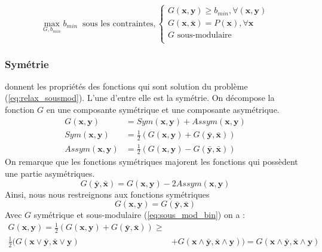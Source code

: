 \documentclass[../main/These_Mathias_Paget.tex]{subfiles}
\begin{document}
	\begin{equation}
		\max_{G,b_{min}}{b_{min}} \; \; \text{sous les contraintes}, \left\{
		\begin{aligned}
			G(\boldsymbol{x},\boldsymbol{y})  \geq b_{min}, \forall (\boldsymbol{x},\boldsymbol{y}) \\
			G(\boldsymbol{x},\bar{\boldsymbol{x}}) =P(\boldsymbol{x}), \forall \boldsymbol{x} \\
			G \text{ sous-modulaire} \\
		\end{aligned}
		\right.
		\label{eq:relax_sousmod}
	\end{equation}	
	
	\subsubsection{Symétrie}
\cite{Kahl12DAM} donnent les propriétés des fonctions qui sont solution du problème (\ref{eq:relax_sousmod}). L'une d'entre elle est la symétrie. On décompose la fonction $G$ en une composante symétrique et une composante asymétrique. 
		\begin{equation}
		\begin{aligned}
		G(\boldsymbol{x},\boldsymbol{y}) &= Sym(\boldsymbol{x},\boldsymbol{y}) + Assym(\boldsymbol{x},\boldsymbol{y}) \\
		Sym(\boldsymbol{x},\boldsymbol{y}) &= \frac{1}{2}(G(\boldsymbol{x},\boldsymbol{y}) + G(\boldsymbol{\bar{y}},\boldsymbol{\bar{x}})) \\
		Assym(\boldsymbol{x},\boldsymbol{y}) &= \frac{1}{2}(G(\boldsymbol{x},\boldsymbol{y}) - G(\boldsymbol{\bar{y}},\boldsymbol{\bar{x}}))		
		\end{aligned}
	\end{equation}
On remarque que les fonctions symétriques majorent les fonctions qui possèdent une partie asymétriques.
	\begin{equation}
		G(\boldsymbol{\bar{y}},\boldsymbol{\bar{x}}) = G(\boldsymbol{x},\boldsymbol{y}) - 2Assym(\boldsymbol{x},\boldsymbol{y})
	\end{equation}	
Ainsi, nous nous restreignons aux fonctions symétriques
	\begin{equation}
		G(\boldsymbol{x},\boldsymbol{y}) = G(\boldsymbol{\bar{y}},\boldsymbol{\bar{x}})
	\end{equation}
	Avec $G$ symétrique et sous-modulaire (\ref{eq:sous_mod_bin}) on a :
	\begin{equation}
	\begin{aligned}
	G(\boldsymbol{x},\boldsymbol{y}) = \frac{1}{2}( G(\boldsymbol{x},\boldsymbol{y}) + G(\boldsymbol{\bar{y}},\boldsymbol{\bar{x}}) ) \geq  & \\ \frac{1}{2} (G(\boldsymbol{x} \vee \boldsymbol{\bar{y}}, \boldsymbol{\bar{x}} \vee \boldsymbol{y}) & + G(\boldsymbol{x} \wedge \boldsymbol{\bar{y}}, \boldsymbol{\bar{x}} \wedge \boldsymbol{y}) ) = G(\boldsymbol{x} \wedge \boldsymbol{\bar{y}}, \boldsymbol{\bar{x}} \wedge \boldsymbol{y})
	\end{aligned}
	\label{eq:bi_sub}
	\end{equation}
\end{document}
